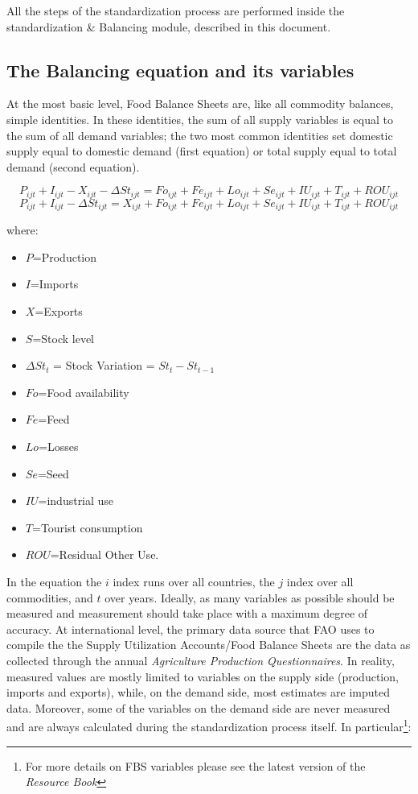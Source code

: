 \documentclass[]{article}
\providecommand{\tightlist}{%
  \setlength{\itemsep}{0pt}\setlength{\parskip}{0pt}}
\let\rmarkdownfootnote\footnote%
\def\footnote{\protect\rmarkdownfootnote}
\begin{document}
All the steps of the standardization process are performed inside the
standardization \& Balancing module, described in this document.

\subsection{The Balancing equation and its
variables}\label{the-balancing-equation-and-its-variables}

At the most basic level, Food Balance Sheets are, like all commodity
balances, simple identities. In these identities, the sum of all supply
variables is equal to the sum of all demand variables; the two most
common identities set domestic supply equal to domestic demand (first
equation) or total supply equal to total demand (second equation).

\begin{equation}
\label{balance1}
P_{ijt} + I_{ijt} - X_{ijt} - \Delta St_{ijt} = Fo_{ijt} + Fe_{ijt} + Lo_{ijt} + Se_{ijt} + IU_{ijt} + T_{ijt}  + ROU_{ijt}
\end{equation}\begin{equation}
\label{balance2}
P_{ijt} + I_{ijt} - \Delta St_{ijt} = X_{ijt} + Fo_{ijt} + Fe_{ijt} + Lo_{ijt} + Se_{ijt} + IU_{ijt} + T_{ijt} + ROU_{ijt}
\end{equation}

where:

\begin{itemize}
\tightlist
\item
  \(P\)=Production
\item
  \(I\)=Imports
\item
  \(X\)=Exports
\item
  \(S\)=Stock level
\item
  \(\Delta St_{t}\) = Stock Variation = \(St_{t} - St_{t-1}\)
\item
  \(Fo\)=Food availability
\item
  \(Fe\)=Feed
\item
  \(Lo\)=Losses
\item
  \(Se\)=Seed
\item
  \(IU\)=industrial use
\item
  \(T\)=Tourist consumption
\item
  \(ROU\)=Residual Other Use.
\end{itemize}

In the equation the \(i\) index runs over all countries, the \(j\) index
over all commodities, and \(t\) over years. Ideally, as many variables
as possible should be measured and measurement should take place with a
maximum degree of accuracy. At international level, the primary data
source that FAO uses to compile the the Supply Utilization Accounts/Food
Balance Sheets are the data as collected through the annual
\emph{Agriculture Production Questionnaires}. In reality, measured
values are mostly limited to variables on the supply side (production,
imports and exports), while, on the demand side, most estimates are
imputed data. Moreover, some of the variables on the demand side are
never measured and are always calculated during the standardization
process itself. In particular\footnote{For more details on FBS variables
  please see the latest version of the \emph{Resource Book}}:
\end{document}
